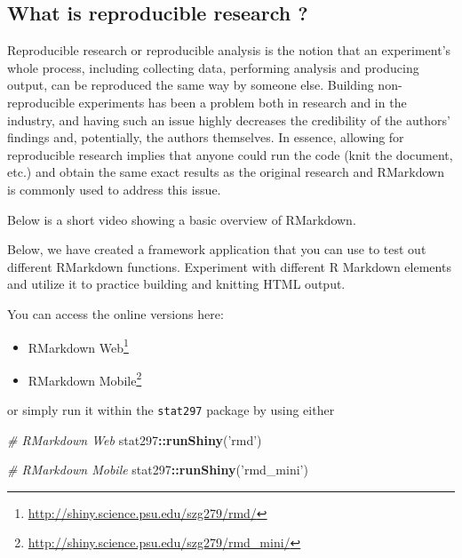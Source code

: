 \documentclass[12pt,]{krantz}
\newenvironment{Shaded}{\begin{snugshade}}{\end{snugshade}}
\newcommand{\KeywordTok}[1]{\textcolor[rgb]{0.27,0.27,0.27}{\textbf{#1}}}
\newcommand{\StringTok}[1]{\textcolor[rgb]{0.5,0.5,0.5}{#1}}
\newcommand{\CommentTok}[1]{\textcolor[rgb]{0.37,0.37,0.37}{\textit{#1}}}
\newcommand{\OperatorTok}[1]{\textcolor[rgb]{0.43,0.43,0.43}{\textbf{#1}}}
\newcommand{\NormalTok}[1]{#1}
\providecommand{\tightlist}{%
  \setlength{\itemsep}{0pt}\setlength{\parskip}{0pt}}
\renewcommand{\href}[2]{#2\footnote{\url{#1}}}
\begin{document}
\subsection*{\texorpdfstring{What is \textbf{reproducible} research
?}{What is reproducible research ?}}\label{what-is-reproducible-research}

Reproducible research or reproducible analysis is the notion that an
experiment's whole process, including collecting data, performing
analysis and producing output, can be reproduced the same way by someone
else. Building non-reproducible experiments has been a problem both in
research and in the industry, and having such an issue highly decreases
the credibility of the authors' findings and, potentially, the authors
themselves. In essence, allowing for reproducible research implies that
anyone could run the code (knit the document, etc.) and obtain the same
exact results as the original research and RMarkdown is commonly used to
address this issue.

Below is a short video showing a basic overview of RMarkdown.

Below, we have created a framework application that you can use to test
out different RMarkdown functions. Experiment with different R Markdown
elements and utilize it to practice building and knitting HTML output.

You can access the online versions here:

\begin{itemize}
\tightlist
\item
  \href{http://shiny.science.psu.edu/szg279/rmd/}{RMarkdown Web}
\item
  \href{http://shiny.science.psu.edu/szg279/rmd_mini/}{RMarkdown Mobile}
\end{itemize}

or simply run it within the \texttt{stat297} package by using either

\begin{Shaded}
\begin{Highlighting}[]
\CommentTok{# RMarkdown Web}
\NormalTok{stat297}\OperatorTok{::}\KeywordTok{runShiny}\NormalTok{(}\StringTok{'rmd'}\NormalTok{)}

\CommentTok{# RMarkdown Mobile}
\NormalTok{stat297}\OperatorTok{::}\KeywordTok{runShiny}\NormalTok{(}\StringTok{'rmd_mini'}\NormalTok{)}
\end{Highlighting}
\end{Shaded}
\end{document}
